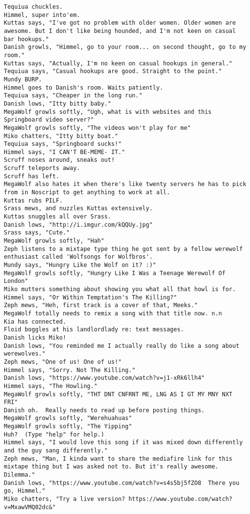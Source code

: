 \begin{verbatim}
Tequiua chuckles.
Himmel, super into'em.
Kuttas says, "I've got no problem with older women. Older women are awesome. But I don't like being hounded, and I'm not keen on casual bar hookups."
Danish growls, "Himmel, go to your room... on second thought, go to my room."
Kuttas says, "Actually, I'm no keen on casual hookups in general."
Tequiua says, "Casual hookups are good. Straight to the point."
Mundy BURP.
Himmel goes to Danish's room. Waits patiently.
Tequiua says, "Cheaper in the long run."
Danish lows, "Itty bitty baby."
MegaWolf growls softly, "Ugh, what is with websites and this Springboard video server?"
MegaWolf growls softly, "The videos won't play for me"
Miko chatters, "Itty bitty boat."
Tequiua says, "Springboard sucks!"
Himmel says, "I CAN'T BE-MEME- IT."
Scruff noses around, sneaks out!
Scruff teleports away.
Scruff has left.
MegaWolf also hates it when there's like twenty servers he has to pick from in Noscript to get anything to work at all.
Kuttas rubs PILF.
Srass mews, and nuzzles Kuttas extensively.
Kuttas snuggles all over Srass.
Danish lows, "http://i.imgur.com/kQQUy.jpg"
Srass says, "Cute."
MegaWolf growls softly, "Hah"
Zeph listens to a mixtape type thing he got sent by a fellow werewolf enthusiast called 'Wolfsongs for Wolfbros'.
Mundy says, "Hungry Like the Wolf on it? :)"
MegaWolf growls softly, "Hungry Like I Was a Teenage Werewolf Of London"
Miko mutters something about showing you what all that howl is for.
Himmel says, "Or Within Temptation's The Killing?"
Zeph mews, "Heh, first track is a cover of that, Meeks."
MegaWolf totally needs to remix a song with that title now. n.n
Kia has connected.
Floid boggles at his landlordlady re: text messages.
Danish licks Miko!
Danish lows, "You reminded me I actually really do like a song about werewolves."
Zeph mews, "One of us! One of us!"
Himmel says, "Sorry. Not The Killing."
Danish lows, "https://www.youtube.com/watch?v=j1-xRk6llh4"
Himmel says, "The Howling."
MegaWolf growls softly, "THT DNT CNFRNT ME, LNG AS I GT MY MNY NXT FRI"
Danish oh.  Really needs to read up before posting things.
MegaWolf growls softly, "Werehuahuas"
MegaWolf growls softly, "The Yipping"
Huh?  (Type "help" for help.)
Himmel says, "I would love this song if it was mixed down differently and the guy sang differently."
Zeph mews, "Man, I kinda want to share the mediafire link for this mixtape thing but I was asked not to. But it's really awesome. Dilemma."
Danish lows, "https://www.youtube.com/watch?v=s4s5bj5fZO8  There you go, Himmel."
Miko chatters, "Try a live version? https://www.youtube.com/watch?v=MxawVMQ02dc&"

\end{verbatim}
